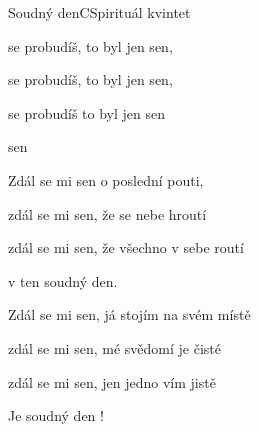 \begin{song}{Soudný den}{C}{Spirituál kvintet}
\begin{SBChorus*}
 se probudíš, to byl jen sen,

 se probudíš, to byl jen sen,

 se probudíš to byl jen sen

  sen

\end{SBChorus*}

\begin{SBVerse}

Zdál se mi sen o poslední pouti,

zdál se mi sen, že se nebe hroutí

zdál se mi sen, že všechno v sebe routí

v ten soudný den.

\end{SBVerse}

\begin{SBVerse}

Zdál se mi sen, já stojím na svém místě

zdál se mi sen, mé svědomí je čisté

zdál se mi sen, jen jedno vím jistě

Je soudný den !

\end{SBVerse}

\end{song}

\clearpage
